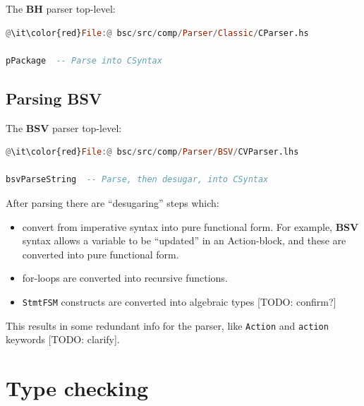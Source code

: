 \documentclass[11pt]{article}
\newcommand{\hmm}{\hspace*{2em}}
\newcommand{\BSV}{\bf{BSV}}
\newcommand{\BH}{\bf{BH}}
\begin{document}
\label{sec:parsing_BH}

The {\BH} parser top-level:

\begin{lstlisting}[language=Haskell]
@\it\color{red}File:@ bsc/src/comp/Parser/Classic/CParser.hs

pPackage  -- Parse into CSyntax
\end{lstlisting}


\subsection{Parsing {\BSV} \hmm {\tt CVParser::bsvParseString}}

\label{sec:parsing_BSV}

The {\BSV} parser top-level:

\begin{lstlisting}[language=Haskell]
@\it\color{red}File:@ bsc/src/comp/Parser/BSV/CVParser.lhs

bsvParseString  -- Parse, then desugar, into CSyntax
\end{lstlisting}

After parsing there are ``desugaring'' steps which:

\begin{itemize}

  \item convert from imperative syntax into pure functional form.  For
    example, {\BSV} syntax allows a variable to be ``updated'' in an
    Action-block, and these are converted into pure functional form.

  \item for-loops are converted into recursive functions.

  \item {\tt StmtFSM} constructs are converted into algebraic types [TODO: confirm?]

\end{itemize}

This results in some redundant info for the parser, like {\tt Action}
and {\tt action} keywords [TODO: clarify].


\section{Type checking \hmm {\tt TypeCheck::cTypeCheck}}
\end{document}
